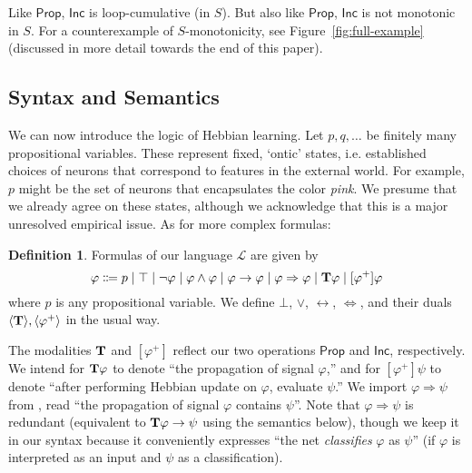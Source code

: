 \documentclass[letterpaper]{article}
\theoremstyle{definition}
\newtheorem{definition}{Definition}
\newcommand{\lang}{\mathcal{L}}
\newcommand{\Typ}{\textrm{\textup{\textbf{T}}}}
\newcommand{\Prop}{\textsf{Prop}}
\newcommand{\Inc}{\textsf{Inc}}
\begin{document}
Like $\Prop$, $\Inc$ is loop-cumulative (in $S$).  But also like $\Prop$, $\Inc$ is not monotonic in $S$.  For a counterexample of $S$-monotonicity, see Figure~\ref{fig:full-example} (discussed in more detail towards the end of this paper).

\subsection{Syntax and Semantics}

We can now introduce the logic of Hebbian learning.  Let $p, q, \ldots$ be finitely many propositional variables.  These represent fixed, `ontic' states, i.e. established choices of neurons that correspond to features in the external world.  For example, $p$ might be the set of neurons that encapsulates the color \emph{pink}.  We presume that we already agree on these states, although we acknowledge that this is a major unresolved empirical issue.  As for more complex formulas:

\begin{definition}  Formulas of our language $\lang$ are given by
\[
\varphi \Coloneqq p \mid \top \mid \neg \varphi \mid \varphi \land \varphi \mid \varphi \to \varphi \mid \varphi \Rightarrow \varphi \mid \Typ \varphi \mid [\varphi^+] \varphi
\]
where $p$ is any propositional variable.  We define $\bot$, $\lor$, $\leftrightarrow$, $\Leftrightarrow$, and their duals $\langle \Typ \rangle, \langle \varphi^+ \rangle$ in the usual way.
\end{definition}

The modalities $\Typ$ and $[\varphi^+]$ reflect our two operations $\Prop$ and $\Inc$, respectively.  We intend for $\Typ \varphi$ to denote ``the propagation of signal $\varphi$,'' and for $[\varphi^+] \psi$ to denote ``after performing Hebbian update on $\varphi$, evaluate $\psi$.''  We import ${\varphi \Rightarrow \psi}$ from \cite{leitgeb2001nonmonotonic}, read ``the propagation of signal $\varphi$ contains $\psi$''.  Note that ${\varphi \Rightarrow \psi}$ is redundant (equivalent to $\Typ \varphi \to \psi$ using the semantics below), though we keep it in our syntax because it conveniently expresses ``the net \emph{classifies} $\varphi$ as $\psi$'' (if $\varphi$ is interpreted as an input and $\psi$ as a classification).
\end{document}
